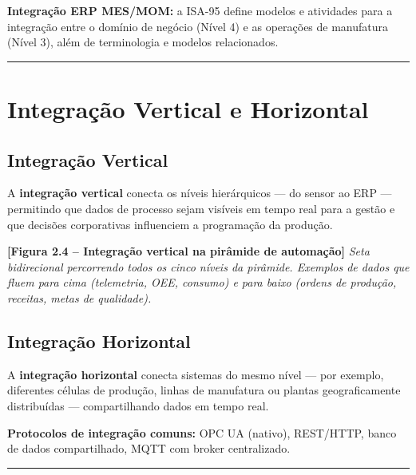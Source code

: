 \textbf{Integração ERP MES/MOM:} a ISA-95 define modelos e atividades para a integração entre o domínio de negócio (Nível 4) e as operações de manufatura (Nível 3), além de terminologia e modelos relacionados.

\begin{center}\rule{0.5\linewidth}{0.5pt}\end{center}

\section{Integração Vertical e Horizontal}\label{integrauxe7uxe3o-vertical-e-horizontal}

\subsection{Integração Vertical}\label{integrauxe7uxe3o-vertical}

A \textbf{integração vertical} conecta os níveis hierárquicos --- do sensor ao ERP --- permitindo que dados de processo sejam visíveis em tempo real para a gestão e que decisões corporativas influenciem a programação da produção.

\begin{caixafigura}

\textbf{{[}Figura 2.4 -- Integração vertical na pirâmide de automação{]}}
\emph{Seta bidirecional percorrendo todos os cinco níveis da pirâmide. Exemplos de dados que fluem para cima (telemetria, OEE, consumo) e para baixo (ordens de produção, receitas, metas de qualidade).}

\end{caixafigura}

\subsection{Integração Horizontal}\label{integrauxe7uxe3o-horizontal}

A \textbf{integração horizontal} conecta sistemas do mesmo nível --- por exemplo, diferentes células de produção, linhas de manufatura ou plantas geograficamente distribuídas --- compartilhando dados em tempo real.

\textbf{Protocolos de integração comuns:} OPC UA (nativo), REST/HTTP, banco de dados compartilhado, MQTT com broker centralizado.

\begin{center}\rule{0.5\linewidth}{0.5pt}\end{center}

